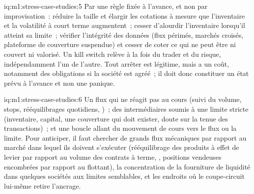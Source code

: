 \begin{solution}{iq:m1:stress-case-studies:5}
Par une règle fixée à l'avance, et non par improvisation~: réduire la taille et élargir les cotations
à mesure que l'inventaire et la volatilité à court terme augmentent~; cesser d'alourdir l'inventaire
lorsqu'il atteint sa limite~; vérifier l'intégrité des données (flux périmés, marchés croisés,
plateforme de couverture suspendue) et cesser de coter ce qui ne peut être ni couvert ni valorisé.
Un kill switch relève à la fois du trader et du risque, indépendamment l'un de l'autre. Tout
arrêter est légitime, mais a un coût, notamment des obligations si la société est 
agréé~; il doit donc constituer un état prévu à l'avance et non une panique.
\end{solution}

\begin{solution}{iq:m1:stress-case-studies:6}
Un flux qui ne réagit pas au cours (suivi du volume, stops, rééquilibrages quotidiens, )~; des intermédiaires soumis à une limite stricte (inventaire, capital, une
couverture qui doit exister, doute sur la tenue des transactions)~; et une boucle allant du mouvement
de cours vers le flux ou la limite. Pour anticiper, il faut chercher de grands flux mécaniques
par rapport au marché dans lequel ils doivent s'exécuter (rééquilibrage des produits à effet
de levier par rapport au volume des contrats à terme, , positions vendeuses
encombrées par rapport au flottant), la concentration de la fourniture de liquidité dans quelques
sociétés aux limites semblables, et les endroits où le coupe-circuit lui-même retire
l'ancrage.
\end{solution}
